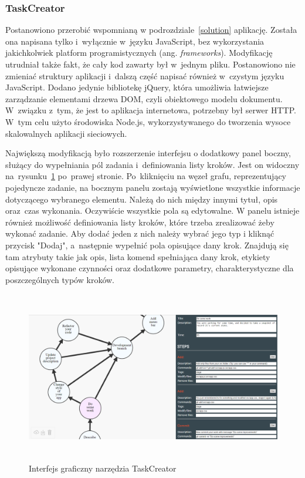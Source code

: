 \documentclass[12pt,a4paper,polish,thesis]{dcsbook}
\begin{document}
{	\subsubsection{TaskCreator}

	Postanowiono przerobić wspomnianą w podrozdziale~\ref{solution} aplikację. Została ona napisana tylko i~wyłącznie w~języku JavaScript, bez wykorzystania jakichkolwiek platform programistycznych (ang. \textit{frameworks}). Modyfikację utrudniał także fakt, że cały kod zawarty był w~jednym pliku. Postanowiono nie zmieniać struktury aplikacji i~dalszą część napisać również w~czystym języku JavaScript. Dodano jedynie bibliotekę jQuery, która umożliwia łatwiejsze zarządzanie elementami drzewa DOM, czyli obiektowego modelu dokumentu. W~związku z~tym, że jest to aplikacja internetowa, potrzebny był serwer HTTP. W~tym celu użyto środowiska Node.js, wykorzystywanego do tworzenia wysoce skalowalnych aplikacji sieciowych.

	Największą modyfikacją było rozszerzenie interfejsu o dodatkowy panel boczny, służący do wypełniania pól zadania i~definiowania listy kroków. Jest on widoczny na~rysunku~\ref{fig:taskCreator} po~prawej stronie. Po~kliknięciu na węzeł grafu, reprezentujący pojedyncze zadanie, na bocznym panelu zostają wyświetlone wszystkie informacje dotyczącego wybranego elementu. Należą do nich między innymi tytuł, opis oraz~czas wykonania. Oczywiście wszystkie pola są edytowalne. W panelu istnieje również możliwość definiowania listy kroków, które trzeba zrealizować żeby wykonać zadanie. Aby dodać jeden z nich należy wybrać jego typ i kliknąć przycisk "Dodaj", a~następnie wypełnić pola opisujące dany krok. Znajdują się tam atrybuty takie jak opis, lista komend spełniająca dany krok, etykiety opisujące wykonane czynności oraz dodatkowe parametry, charakterystyczne dla poszczególnych typów kroków.
	
	\begin{figure}[h]
		\centering
		\includegraphics[height=7.5cm]{taskCreator01}
		\caption{Interfejs graficzny narzędzia TaskCreator}
		\label{fig:taskCreator}
	\end{figure}

}
\end{document}
